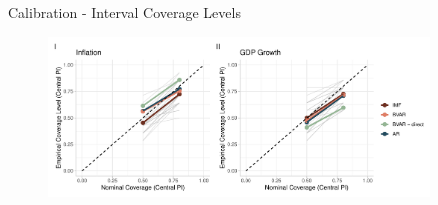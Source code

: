 \documentclass[en]{sdqbeamer}
\begin{document}


\begin{frame}{Calibration - Interval Coverage Levels}
    \begin{figure}
        \centering
        \includegraphics[width=0.9\textwidth]{figures/coverage.pdf}
        \label{fig:enter-label}
    \end{figure}
\end{frame}
\end{document}
